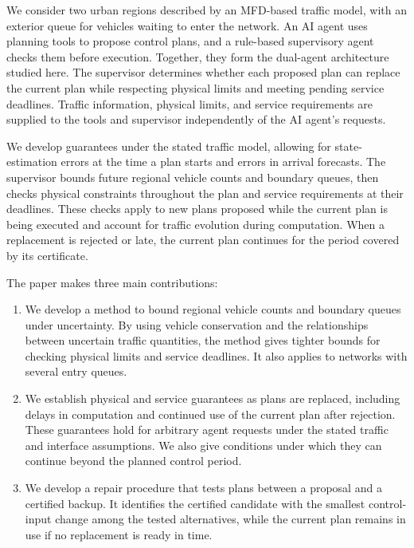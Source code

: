 \documentclass[preprint,12pt]{elsarticle}
\theoremstyle{definition}
\theoremstyle{plain}
\theoremstyle{definition}
\theoremstyle{plain}
\begin{document}
We consider two urban regions described by an MFD-based traffic model,
with an exterior queue for vehicles waiting to enter the network. An AI
agent uses planning tools to propose control plans, and a rule-based
supervisory agent checks them before execution. Together, they form the
dual-agent architecture studied here. The supervisor determines whether
each proposed plan can replace the current plan while respecting physical
limits and meeting pending service deadlines. Traffic information,
physical limits, and service requirements are supplied to the tools and
supervisor independently of the AI agent's requests.

We develop guarantees under the stated traffic model, allowing for
state-estimation errors at the time a plan starts and errors in arrival
forecasts. The supervisor bounds future regional vehicle counts and
boundary queues, then checks physical constraints throughout the plan and
service requirements at their deadlines. These checks apply to new plans
proposed while the current plan is being executed and account for traffic
evolution during computation. When a replacement is rejected or late,
the current plan continues for the period covered by its certificate.

The paper makes three main contributions:
\begin{enumerate}
\item We develop a method to bound regional vehicle counts and boundary
queues under uncertainty. By using vehicle conservation and the
relationships between uncertain traffic quantities, the method gives
tighter bounds for checking physical limits and service deadlines. It
also applies to networks with several entry queues.

\item We establish physical and service guarantees as plans are replaced,
including delays in computation and continued use of the current plan
after rejection. These guarantees hold for arbitrary agent requests under
the stated traffic and interface assumptions. We also give conditions
under which they can continue beyond the planned control period.

\item We develop a repair procedure that tests plans between a proposal
and a certified backup. It identifies the certified candidate with the
smallest control-input change among the tested alternatives, while the
current plan remains in use if no replacement is ready in time.
\end{enumerate}
\end{document}
